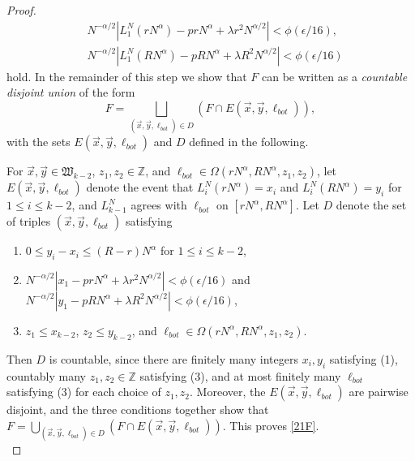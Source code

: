 \begin{proof}
\begin{equation}
		\begin{split}
		& N^{-\alpha/2}\left|L_1^N(rN^\alpha) - prN^\alpha + \lambda r^2N^{\alpha/2}\right| < \phi(\epsilon/16),\\
		& N^{-\alpha/2}\left|L_1^N(RN^\alpha) - pRN^\alpha + \lambda R^2N^{\alpha/2}\right| < \phi(\epsilon/16)
		\end{split}
		\end{equation}
		hold. In the remainder of this step we show that $F$ can be written as a \textit{countable disjoint union} of the form
		\begin{equation}\label{21F}
		F = \bigsqcup_{(\vec{x},\vec{y},\ell_{bot})\in D} \left( F \cap E(\vec{x},\vec{y},\ell_{bot})\right),
		\end{equation} 
		with the sets $E(\vec{x},\vec{y},\ell_{bot})$ and $D$
		defined in the following.
		
		For $\vec{x},\vec{y}\in\mathfrak{W}_{k-2}$, $z_1,z_2\in\mathbb{Z}$, and $\ell_{bot}\in\Omega(rN^\alpha,RN^\alpha,z_1,z_2)$, let $E(\vec{x},\vec{y},\ell_{bot})$ denote the event that $L_i^N(rN^\alpha) = x_i$ and $L_i^N(RN^\alpha)=y_i$ for $1\leq i\leq k-2$, and $L_{k-1}^N$ agrees with $\ell_{bot}$ on $[rN^\alpha,RN^\alpha]$. Let $D$ denote the set of triples $(\vec{x},\vec{y},\ell_{bot})$ satisfying
		\begin{enumerate}[label=(\arabic*)]
			
			\item $0\leq y_i - x_i \leq (R-r)N^\alpha$ for $1\leq i\leq k-2$,
			
			\item $N^{-\alpha/2}|x_1 - prN^\alpha + \lambda r^2N^{\alpha/2}| < \phi(\epsilon/16)$ and $N^{-\alpha/2}|y_1-pRN^\alpha + \lambda R^2N^{\alpha/2}| < \phi(\epsilon/16)$,
			
			\item $z_1\leq x_{k-2}$, $z_2\leq y_{k-2}$, and $\ell_{bot} \in \Omega(rN^\alpha,RN^\alpha,z_1,z_2)$.
			
		\end{enumerate}
		Then $D$ is countable, since there are finitely many integers $x_i,y_i$ satisfying (1), countably many $z_1,z_2\in\mathbb{Z}$ satisfying (3), and at most finitely many $\ell_{bot}$ satisfying (3) for each choice of $z_1,z_2$. Moreover, the $E(\vec{x},\vec{y},\ell_{bot})$ are pairwise disjoint, and the three conditions together show that $F = \bigcup_{(\vec{x},\vec{y},\ell_{bot})\in D} (F\cap E(\vec{x},\vec{y},\ell_{bot}))$. This proves \eqref{21F}.\\
		

\end{proof}
